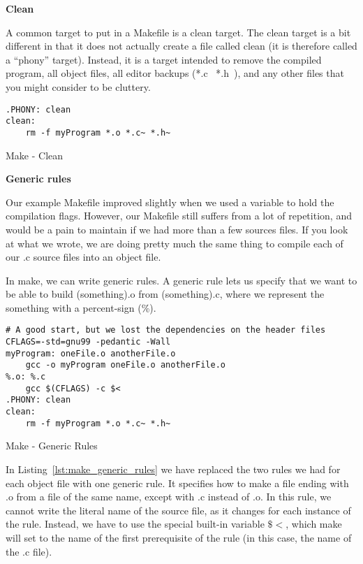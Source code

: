 \documentclass[11pt, a4paper]{article}
\begin{document}
\textbf{Clean}



A common target to put in a Makefile is a clean target. The clean target is a bit different in that it does not actually create a file called clean (it is therefore called a “phony” target). Instead, it is a target intended to remove the compiled program, all object files, all editor backups (*.c~ *.h~), and any other files that you might consider to be cluttery.


\begin{listing}
\begin{verbatim}
.PHONY: clean
clean:
    rm -f myProgram *.o *.c~ *.h~
\end{verbatim}
\caption{Make - Clean}
\label{lst:make_clean}
\end{listing}


\textbf{Generic rules}


Our example Makefile improved slightly when we used a variable to hold the compilation flags. However, our Makefile still suffers from a lot of repetition, and would be a pain to maintain if we had more than a few sources files. If you look at what we wrote, we are doing pretty much the same thing to compile each of our .c source files into an object file.

In make, we can write generic rules. A generic rule lets us specify that we want to be able to build (something).o from (something).c, where we represent the something with a percent-sign (\%). 


\begin{listing}
\begin{verbatim}
# A good start, but we lost the dependencies on the header files
CFLAGS=-std=gnu99 -pedantic -Wall
myProgram: oneFile.o anotherFile.o
    gcc -o myProgram oneFile.o anotherFile.o
%.o: %.c
    gcc $(CFLAGS) -c $<
.PHONY: clean
clean:
    rm -f myProgram *.o *.c~ *.h~
\end{verbatim}
\caption{Make - Generic Rules}
\label{lst:make_generic_rules}
\end{listing}



In Listing~\ref{lst:make_generic_rules} we have replaced the two rules we had for each object file with one generic rule. It specifies how to make a file ending with .o from a file of the same name, except with .c instead of .o. In this rule, we cannot write the literal name of the source file, as it changes for each instance of the rule. Instead, we have to use the special built-in variable $\$<$, which make will set to the name of the first prerequisite of the rule (in this case, the name of the .c file).
\end{document}
